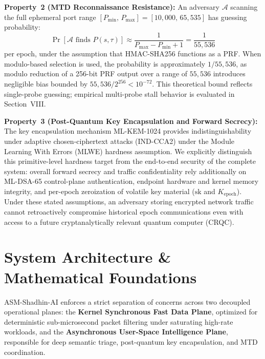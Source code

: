 \documentclass{ieeeaccess}
\renewcommand{\_}{\textunderscore\allowbreak}
\begin{document}
\textbf{Property~2 (MTD Reconnaissance Resistance):}
An adversary $\mathcal{A}$ scanning the full ephemeral port range
$[P_{\min},\, P_{\max}] = [10{,}000,\, 65{,}535]$ has guessing probability:
\begin{equation}
  \Pr\!\left[\mathcal{A}\text{ finds }P(s,\tau)\right]
    \approx \frac{1}{P_{\max} - P_{\min} + 1} = \frac{1}{55{,}536}
  \label{eq:mtd_resistance}
\end{equation}
per epoch, under the assumption that HMAC-SHA256 functions as a PRF. When modulo-based
selection is used, the probability is approximately $1/55{,}536$, as modulo reduction
of a 256-bit PRF output over a range of $55{,}536$ introduces negligible bias bounded
by $55{,}536 / 2^{256} < 10^{-72}$. This theoretical bound reflects single-probe guessing;
empirical multi-probe stall behavior is evaluated in Section~VIII.

\textbf{Property~3 (Post-Quantum Key Encapsulation and Forward Secrecy):}
The key encapsulation mechanism ML-KEM-1024 provides indistinguishability under
adaptive chosen-ciphertext attacks (IND-CCA2) under the Module Learning With Errors
(MLWE) hardness assumption. We explicitly distinguish this primitive-level
hardness target from the end-to-end security of the complete system: overall
forward secrecy and traffic confidentiality rely additionally on ML-DSA-65
control-plane authentication, endpoint hardware and kernel memory integrity, and
per-epoch zeroization of volatile key material ($\text{sk}$ and $K_{\text{epoch}}$).
Under these stated assumptions, an adversary storing encrypted network traffic cannot
retroactively compromise historical epoch communications even with access to a future
cryptanalytically relevant quantum computer (CRQC).

\section{System Architecture \& Mathematical Foundations}
ASM-Shadhin-AI enforces a strict separation of concerns across two decoupled
operational planes: the \textbf{Kernel Synchronous Fast Data Plane}, optimized
for deterministic sub-microsecond packet filtering under saturating high-rate workloads, and the
\textbf{Asynchronous User-Space Intelligence Plane}, responsible for deep
semantic triage, post-quantum key encapsulation, and MTD coordination.
\end{document}
